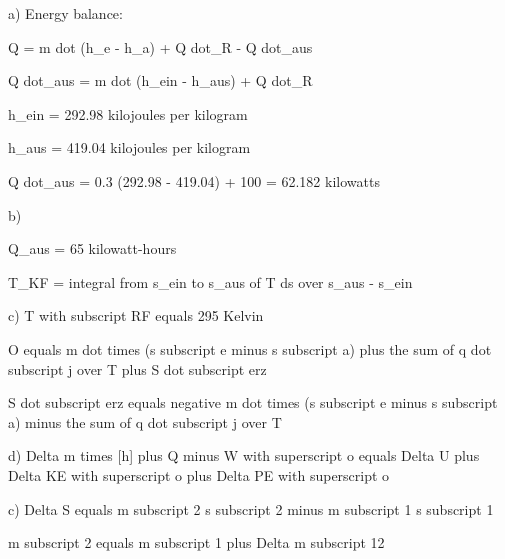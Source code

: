 a) Energy balance:

Q = m dot (h_e - h_a) + Q dot_R - Q dot_aus

Q dot_aus = m dot (h_ein - h_aus) + Q dot_R

h_ein = 292.98 kilojoules per kilogram

h_aus = 419.04 kilojoules per kilogram

Q dot_aus = 0.3 (292.98 - 419.04) + 100 = 62.182 kilowatts

b)

Q_aus = 65 kilowatt-hours

T_KF = integral from s_ein to s_aus of T ds over s_aus - s_ein

c) 
T with subscript RF equals 295 Kelvin

O equals m dot times (s subscript e minus s subscript a) plus the sum of q dot subscript j over T plus S dot subscript erz

S dot subscript erz equals negative m dot times (s subscript e minus s subscript a) minus the sum of q dot subscript j over T

d) 
Delta m times [h] plus Q minus W with superscript o equals Delta U plus Delta KE with superscript o plus Delta PE with superscript o

c) 
Delta S equals m subscript 2 s subscript 2 minus m subscript 1 s subscript 1

m subscript 2 equals m subscript 1 plus Delta m subscript 12